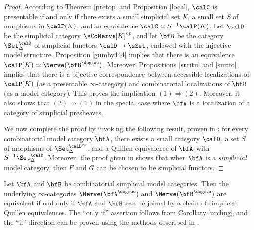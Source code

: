 \begin{proof}
According to Theorem \ref{pretop} and Proposition \ref{local}, $\calC$ is presentable if and only if there exists a small simplicial set $K$, a small set $S$ of morphisms in $\calP(K)$, and an equivalence $\calC \simeq S^{-1} \calP(K)$. Let $\calD$ be the simplicial category $\sCoNerve[K]^{op}$, and let $\bfB$ be the category $\Set_{\Delta}^{\calD}$ of 
simplicial functors $\calD \rightarrow \sSet$, endowed with the injective model structure. Proposition \ref{gumby444} implies that there is an equivalence $\calP(K) \simeq \Nerve( \bfB^{\degree})$. Moreover, Propositions \ref{suritu} and \ref{surito} implies that there is a bijective correspondence between accessible localizations of
$\calP(K)$ (as a presentable $\infty$-category) and combinatorial localizations of $\bfB$ (as a model category). This proves the implication $(1) \Rightarrow (2)$. Moreover, it also shows that $(2) 
\Rightarrow (1)$ in the special case where $\bfA$ is a localization of a category of simplicial presheaves. 

We now complete the proof by invoking the following result, proven in \cite{combmodel}: for every combinatorial model category $\bfA$, there exists a small category $\calD$, a set $S$ of morphisms of $\Set^{\calD^{op}}_{\Delta}$, and a Quillen equivalence of $\bfA$ with $S^{-1} \Set_{\Delta}^{\calD}$.
Moreover, the proof given in \cite{combmodel} shows that when $\bfA$ is a {\em simplicial} model category, then $F$ and $G$ can be chosen to be simplicial functors.
\end{proof}

\begin{remark}
Let $\bfA$ and $\bfB$ be combinatorial simplicial model categories. Then the underlying $\infty$-categories $\Nerve( \bfA^{\degree})$ and $\Nerve( \bfB^{\degree})$ are equivalent if and only if $\bfA$ and $\bfB$ can be joined by a chain of simplicial Quillen equivalences. The ``only if'' assertion follows from Corollary \ref{urchug}, and the ``if'' direction can be proven using the methods described in \cite{combmodel}.
\end{remark}

